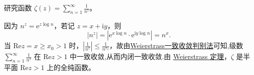 \documentclass[../../main.tex]{subfiles}
\begin{document}
\begin{example}
研究函数 \( \zeta(z) = \sum_{n=1}^{\infty} \frac{1}{n^z} \)。
\end{example}
\begin{solution}
因为 \( n^z = \mathrm{e}^{z \log n} \)，若记 \( z = x + \mathrm{i}y \)，则
\[
|n^z| = |\mathrm{e}^{x \log n} \cdot \mathrm{e}^{\mathrm{i}y \log n}| = n^x.
\]
当 \( \mathrm{Re}z = x \geqslant x_0 > 1 \) 时，\( \left| \frac{1}{n^z} \right| \leqslant \frac{1}{n^{x_0}} \)，故由\hyperref[theorem:Weierstrass一致收敛判别法]{Weierstrass一致收敛判别法}可知,级数 \( \sum_{n=1}^{\infty} \frac{1}{n^z} \) 在 \( \mathrm{Re}z > 1 \) 中一致收敛,从而内闭一致收敛.由 \hyperref[theorem:Weierstrass定理]{Weierstrass 定理}，\( \zeta \) 是半平面 \( \mathrm{Re}z > 1 \) 上的全纯函数。

\end{solution}
\end{document}
